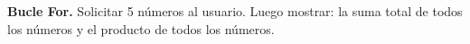 \textbf{Bucle For.} Solicitar 5 n\'umeros al usuario. Luego mostrar: la suma total de todos los n\'umeros y el producto de todos los n\'umeros.



\volverindice
\newpage
